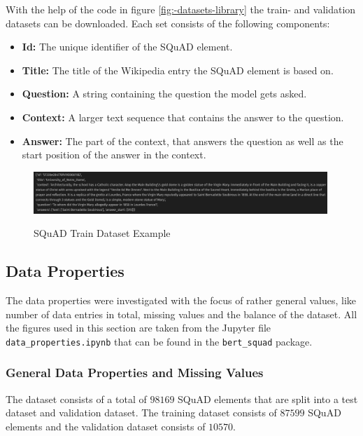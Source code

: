             With the help of the code in figure \ref{fig:-datasets-library} the train- and validation datasets can be downloaded.
            Each set consists of the following components:
            \begin{itemize}
                \item \textbf{Id:} The unique identifier of the SQuAD element.
                \item \textbf{Title:} The title of the Wikipedia entry the SQuAD element is based on.
                \item \textbf{Question:} A string containing the question the model gets asked.
                \item \textbf{Context:} A larger text sequence that contains the answer to the question.
                \item \textbf{Answer:} The part of the context, that answers the question as well as the start position of the answer in the context.
            \end{itemize}

            \begin{figure}
                \centering
                \caption{SQuAD Train Dataset Example\cite[\texttt{bert\_training.ipynb}]{innerProject}}
                \includegraphics[width=0.99\textwidth]{figures/train_dataset_example.png}
                \label{fig:-train-dataset-example}
            \end{figure}

        \subsection{Data Properties}
        \label{subsec:-data-properties}

            The data properties were investigated with the focus of rather general values, like number of data entries in total, missing values and the balance of the dataset. All the figures used in this section are taken from the Jupyter file \texttt{data\_properties.ipynb} that can be found in the \texttt{bert\_squad} package.
            
            \subsubsection{General Data Properties and Missing Values}
            \label{subsubsection:-data-properties---missing-values}
                The dataset consists of a total of $98169$ SQuAD elements that are split into a test dataset and validation dataset. The training dataset consists of $87599$ SQuAD elements and the validation dataset consists of $10570$.

